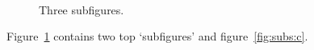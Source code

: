     \begin{figure}%
    \centering
    \qquad
    \\
    \caption{Three subfigures.}
    \label{fig:subs}
    \end{figure}
    Figure~\ref{fig:subs} contains two top ‘subfigures’ and
    figure~\ref{fig:subs:c}.
